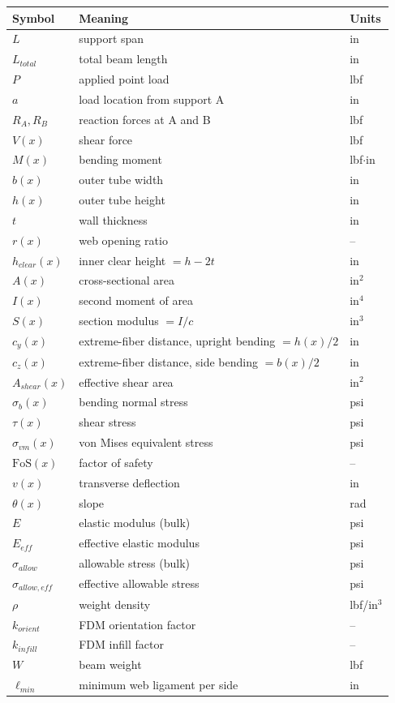 \documentclass[11pt,letterpaper]{article}
\begin{document}
\begin{center}
\begin{tabular}{lll}
\toprule
Symbol & Meaning & Units \\
\midrule
$L$ & support span & in \\
$L_{total}$ & total beam length & in \\
$P$ & applied point load & lbf \\
$a$ & load location from support A & in \\
$R_A, R_B$ & reaction forces at A and B & lbf \\
$V(x)$ & shear force & lbf \\
$M(x)$ & bending moment & lbf$\cdot$in \\
$b(x)$ & outer tube width & in \\
$h(x)$ & outer tube height & in \\
$t$ & wall thickness & in \\
$r(x)$ & web opening ratio & -- \\
$h_{clear}(x)$ & inner clear height $= h-2t$ & in \\
$A(x)$ & cross-sectional area & in$^2$ \\
$I(x)$ & second moment of area & in$^4$ \\
$S(x)$ & section modulus $= I/c$ & in$^3$ \\
$c_y(x)$ & extreme-fiber distance, upright bending $= h(x)/2$ & in \\
$c_z(x)$ & extreme-fiber distance, side bending $= b(x)/2$ & in \\
$A_{shear}(x)$ & effective shear area & in$^2$ \\
$\sigma_b(x)$ & bending normal stress & psi \\
$\tau(x)$ & shear stress & psi \\
$\sigma_{vm}(x)$ & von Mises equivalent stress & psi \\
$\mathrm{FoS}(x)$ & factor of safety & -- \\
$v(x)$ & transverse deflection & in \\
$\theta(x)$ & slope & rad \\
$E$ & elastic modulus (bulk) & psi \\
$E_{eff}$ & effective elastic modulus & psi \\
$\sigma_{allow}$ & allowable stress (bulk) & psi \\
$\sigma_{allow,eff}$ & effective allowable stress & psi \\
$\rho$ & weight density & lbf/in$^3$ \\
$k_{orient}$ & FDM orientation factor & -- \\
$k_{infill}$ & FDM infill factor & -- \\
$W$ & beam weight & lbf \\
$\ell_{min}$ & minimum web ligament per side & in \\
\bottomrule
\end{tabular}
\end{center}
\end{document}

